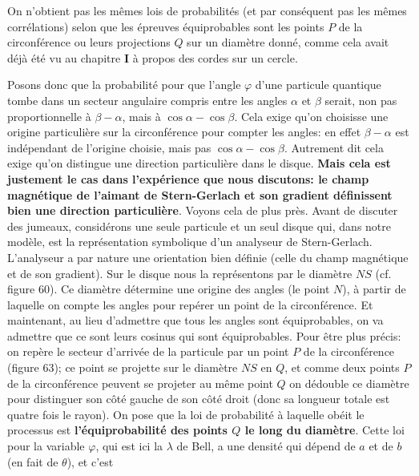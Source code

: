 \vskip4pt 
\centerline{\vbox{\hsize=11cm \eightpoint  
On n'obtient pas les m\^emes lois de probabilit\'es (et par cons\'equent  
pas les m\^emes corr\'elations) selon que les \'epreuves \'equiprobables  
sont les points $P$ de la circonf\'erence ou leurs projections $Q$ sur un 
diam\`etre donn\'e, comme cela avait d\'ej\`a \'et\'e vu au chapitre  
{\bf  I} \`a propos des cordes sur un cercle.}  } 
\vskip3mm 
\endinsert  
Posons donc que la probabilit\'e pour que l'angle $\varphi$ d'une 
particule quantique tombe dans un secteur angulaire  compris entre les 
angles  $\alpha$ et $\beta$ serait, non pas proportionnelle \`a $\beta - 
\alpha$,  mais \`a $\cos\alpha -\cos\beta$. Cela exige qu'on choisisse  
une origine particuli\`ere sur la circonf\'erence pour  compter les angles: 
en effet  $\beta - \alpha$ est ind\'ependant de l'origine choisie, mais 
pas $\cos\alpha -\cos\beta$. Autrement dit cela exige qu'on distingue  
une  direction particuli\`ere dans le disque. {\bf Mais cela est justement 
le cas dans l'exp\'erience que nous discutons: le champ magn\'etique de 
l'aimant de Stern-Gerlach et  son gradient d\'efinissent  bien une  
direction particuli\`ere}.   
\medskip 
Voyons cela de plus pr\`es. Avant de discuter des jumeaux, consid\'erons 
une seule particule et un seul disque qui, dans notre mod\`ele,  
est la repr\'esentation  symbolique d'un analyseur de Stern-Gerlach.  
L'analyseur a par nature  une orientation  bien d\'efinie (celle du champ 
magn\'etique  et de son gradient). Sur le disque nous la repr\'esentons  
par le  diam\`etre $NS$ (cf. figure 60). Ce diam\`etre  d\'etermine une 
origine des angles (le point $N$), \`a partir de laquelle on  compte les 
angles  pour rep\'erer un point de la circonf\'erence. Et maintenant, au 
lieu d'admettre que tous les angles sont \'equiprobables, on va admettre 
que ce sont leurs cosinus qui sont \'equiprobables. Pour \^etre plus 
pr\'ecis: on rep\`ere le secteur d'arriv\'ee de la particule  par un point  
$P$ de la circonf\'erence (figure 63); ce point se projette sur le 
diam\`etre $NS$ en $Q$,  et comme deux points $P$ de la circonf\'erence 
peuvent se projeter au m\^eme point $Q$ on d\'edouble ce diam\`etre  
pour distinguer son  c\^ot\'e gauche de son c\^ot\'e droit (donc sa  
longueur totale est quatre fois le rayon). On pose que la loi de 
probabilit\'e \`a laquelle  ob\'eit le processus est {\bf 
l'\'equiprobabilit\'e des points $Q$ le long  du diam\`etre}.  Cette
loi pour la variable $\varphi$, qui est ici la $\lambda$ de Bell, a une 
densit\'e qui d\'epend de $a$ et de $b$ (en fait de $\theta$), et c'est 
